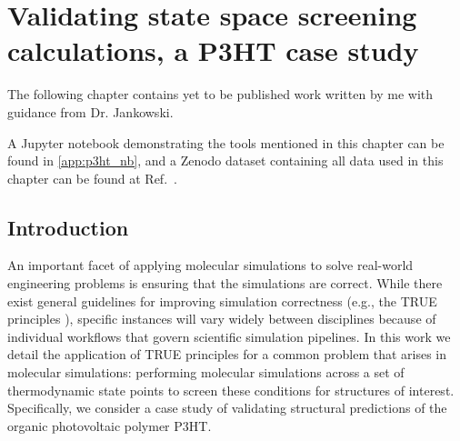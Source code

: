 \chapter{Validating state space screening calculations, a P3HT case study}
\label{chap:p3ht_validation}

The following chapter contains yet to be published work written by me with guidance from Dr. Jankowski.

A Jupyter notebook demonstrating the tools mentioned in this chapter can be found in \autoref{app:p3ht_nb}, and a Zenodo dataset containing all data used in this chapter can be found at Ref.~\citet{Fothergill2022}.

\section{Introduction}

An important facet of applying molecular simulations to solve real-world engineering problems is ensuring that the simulations are correct.
While there exist general guidelines for improving simulation correctness (e.g., the TRUE principles \cite{Thompson2020}), specific instances will vary widely between disciplines because of individual workflows that govern scientific simulation pipelines. 
In this work we detail the application of TRUE principles for a common problem that arises in molecular simulations: performing molecular simulations across a set of thermodynamic state points to screen these conditions for structures of interest. 
Specifically, we consider a case study of validating structural predictions of the organic photovoltaic polymer P3HT. 


